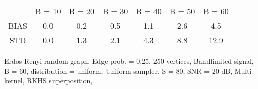 \begin{tabular}{ccccccc}
	\hline
		 & B = 10 & B = 20 & B = 30 & B = 40 & B = 50 & B = 60	\hline
		\\
	BIAS	 & 0.0 & 0.2 & 0.5 & 1.1 & 2.6 & 4.5\\
	STD	 & 0.0 & 1.3 & 2.1 & 4.3 & 8.8 & 12.9\\
	\hline
\end{tabular}Erdos-Renyi random graph, 
Edge prob. = 0.25, 250 vertices, 
Bandlimited signal, B = 60, 
distribution = uniform, Uniform sampler, 
S = 80, SNR = 20 dB, Multi-kernel, 
RKHS superposition, 